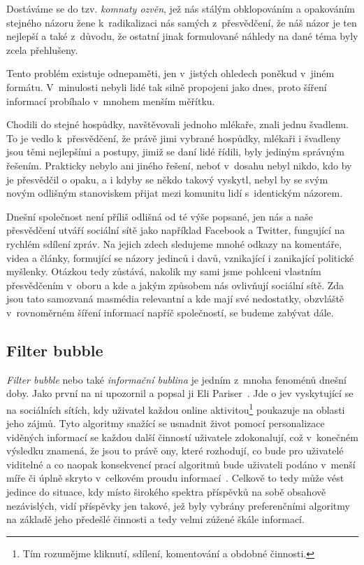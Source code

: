 \documentclass[12pt, a4paper]{article}
\numberwithin{equation}{section} 	%
\begin{document}
Dostáváme se do tzv. \textit{komnaty ozvěn}, jež nás stálým obklopováním a opakováním stejného názoru žene k radikalizaci nás samých z přesvědčení, že náš názor je ten nejlepší a také z důvodu, že ostatní jinak formulované náhledy na dané téma byly zcela přehlušeny.

Tento problém existuje odnepaměti, jen v jistých ohledech poněkud v jiném formátu. V minulosti nebyli lidé tak silně propojeni jako dnes, proto šíření informací probíhalo v mnohem menším měřítku.

Chodili do stejné hospůdky, navštěvovali jednoho mlékaře, znali jednu švadlenu. To je vedlo k přesvědčení, že právě jimi vybrané hospůdky, mlékaři i švadleny jsou těmi nejlepšími a postupy, jimiž se daní lidé řídili, byly jediným správným řešením. Prakticky nebylo ani jiného řešení, neboť v dosahu nebyl nikdo, kdo by je přesvědčil o opaku, a i kdyby se někdo takový vyskytl, nebyl by se svým novým odlišným stanoviskem přijat mezi komunitu lidí s identickým názorem.

Dnešní společnost není příliš odlišná od té výše popsané, jen nás a naše přesvědčení utváří sociální sítě jako například Facebook a Twitter, fungující na rychlém sdílení zpráv.  Na jejich zdech sledujeme mnohé odkazy na komentáře, videa a články, formující se názory jedinců i davů, vznikající i zanikající politické myšlenky. Otázkou tedy zůstává, nakolik my sami jsme pohlceni vlastním přesvědčením v oboru a kde a jakým způsobem nás ovlivňují sociální sítě.  Zda jsou tato samozvaná masmédia relevantní a kde mají své nedostatky, obzvláště v rovnoměrném šíření informací napříč společností, se budeme zabývat dále.


\subsection{Filter bubble}
\noindent \textit{Filter bubble} nebo také \textit{informační bublina} je jedním z mnoha fenoménů dnešní doby. Jako první na ni upozornil a popsal ji Eli Pariser~\cite{Pariser2011, PariserTed}. Jde o jev vyskytující se na sociálních sítích, kdy uživatel každou online aktivitou\footnote{Tím rozumějme kliknutí, sdílení, komentování a obdobné činnosti.} poukazuje na oblasti jeho zájmů. Tyto algoritmy snažící se usnadnit život pomocí personalizace viděných informací se každou další činností uživatele zdokonalují, což v konečném výsledku znamená, že jsou to právě ony, které rozhodují, co bude pro uživatelé viditelné a co naopak konsekvencí prací algoritmů bude uživateli podáno v menší míře či úplně skryto v celkovém proudu informací~\cite{TheImpactOfFilterBubble}. Celkově to tedy může vést jedince do situace, kdy místo širokého spektra příspěvků na sobě obsahově nezávislých, vidí příspěvky jen takové, jež byly vybrány preferenčními algoritmy na základě jeho předešlé činnosti a tedy velmi zúžené škále informací.
\end{document}
